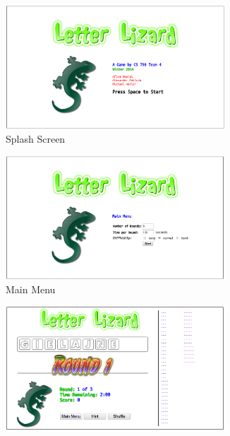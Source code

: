 \begin{figure}
    \centering
    \begin{subfigure}{0.49\textwidth}
        \includegraphics[width=0.9\textwidth]{../screenshots/LetterLizardJS-SplashScreen2.png}
        \caption{Splash Screen}
        \label{lljssplash}
    \end{subfigure}
    \begin{subfigure}{0.49\textwidth}
        \includegraphics[width=0.9\textwidth]{../screenshots/LetterLizardJS-MainMenu2.png}
        \caption{Main Menu}
        \label{lljsmm}
    \end{subfigure}
    \begin{subfigure}{0.49\textwidth}
        \includegraphics[width=0.9\textwidth]{../screenshots/LetterLizardJS-Round1.png}

\end{subfigure}
\end{figure}
